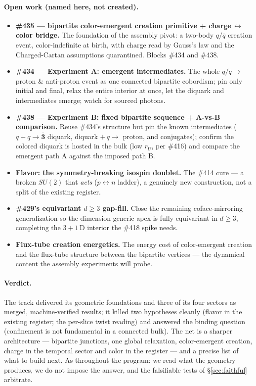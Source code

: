 \documentclass[11pt]{article}
\theoremstyle{definition}
\newcommand{\rep}[1]{\mathbf{#1}}
\begin{document}
\paragraph{Open work (named here, not created).}
\begin{itemize}[nosep]
  \item \textbf{\#435 --- bipartite color-emergent creation primitive + charge\,$\leftrightarrow$\,color
  bridge.} The foundation of the assembly pivot: a two-body $q/\bar q$ creation event,
  color-indefinite at birth, with charge read by Gauss's law and the Charged-Cartan
  assumptions quarantined. Blocks \#434 and \#438.
  \item \textbf{\#434 --- Experiment A: emergent intermediates.} The whole
  $q/\bar q\to$ proton \& anti-proton event as one connected bipartite cobordism; pin only
  initial and final, relax the entire interior at once, let the diquark and intermediates
  emerge; watch for sourced photons.
  \item \textbf{\#438 --- Experiment B: fixed bipartite sequence + A-vs-B comparison.}
  Reuse \#434's structure but pin the known intermediates
  ($q+q\to\bar{\rep3}$ diquark, diquark $+\,q\to$ proton, and conjugates); confirm the
  colored diquark is hosted in the bulk (low $r_U$, per \#416) and compare the emergent
  path A against the imposed path B.
  \item \textbf{Flavor: the symmetry-breaking isospin doublet.} The \#414 cure --- a broken
  $SU(2)$ that \emph{acts} ($p\leftrightarrow n$ ladder), a genuinely new construction, not
  a split of the existing register.
  \item \textbf{\#429's equivariant $d\ge3$ gap-fill.} Close the remaining
  coface-mirroring generalization so the dimension-generic apex is fully equivariant in
  $d\ge3$, completing the $3+1$\,D interior the \#418 spike needs.
  \item \textbf{Flux-tube creation energetics.} The energy cost of color-emergent creation
  and the flux-tube structure between the bipartite vertices --- the dynamical content the
  assembly experiments will probe.
\end{itemize}

\paragraph{Verdict.} The track delivered its geometric foundations and three of its four
sectors as merged, machine-verified results; it killed two hypotheses cleanly (flavor in
the existing register; the per-slice twist reading) and answered the binding question
(confinement is not fundamental in a connected bulk). The net is a sharper architecture ---
bipartite junctions, one global relaxation, color-emergent creation, charge in the temporal
sector and color in the register --- and a precise list of what to build next. As
throughout the program: we read what the geometry produces, we do not impose the answer,
and the falsifiable tests of \S\ref{sec:faithful} arbitrate.
\end{document}
